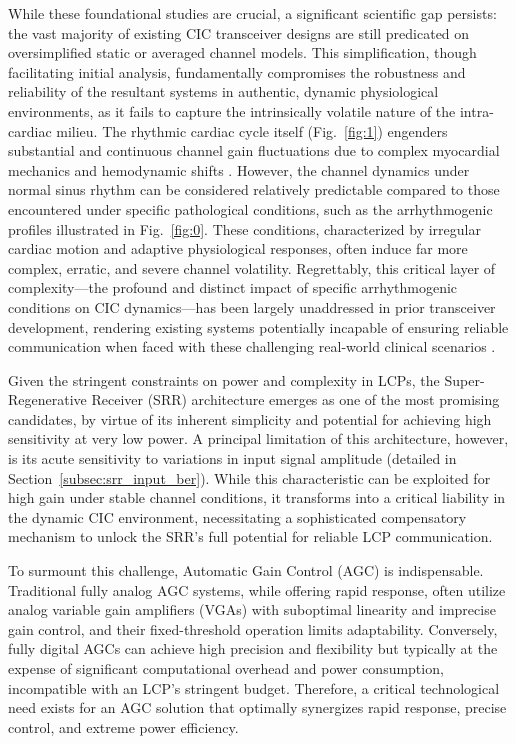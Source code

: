 \documentclass[journal]{IEEEtran}
\begin{document}
While these foundational studies are crucial, a significant scientific gap persists: the vast majority of existing CIC transceiver designs are still predicated on oversimplified static or averaged channel models. This simplification, though facilitating initial analysis, fundamentally compromises the robustness and reliability of the resultant systems in authentic, dynamic physiological environments, as it fails to capture the intrinsically volatile nature of the intra-cardiac milieu. The rhythmic cardiac cycle itself (Fig.~\ref{fig:1}) engenders substantial and continuous channel gain fluctuations due to complex myocardial mechanics and hemodynamic shifts \cite{Zhang2019_placeholder_if_exists}. However, the channel dynamics under normal sinus rhythm can be considered relatively predictable compared to those encountered under specific pathological conditions, such as the arrhythmogenic profiles illustrated in Fig.~\ref{fig:0}. These conditions, characterized by irregular cardiac motion and adaptive physiological responses, often induce far more complex, erratic, and severe channel volatility. Regrettably, this critical layer of complexity—the profound and distinct impact of specific arrhythmogenic conditions on CIC dynamics—has been largely unaddressed in prior transceiver development, rendering existing systems potentially incapable of ensuring reliable communication when faced with these challenging real-world clinical scenarios \cite{Ryser2022ModulationScheme, Bereuter2019LeadlessResync}.

Given the stringent constraints on power and complexity in LCPs, the Super-Regenerative Receiver (SRR) architecture emerges as one of the most promising candidates, by virtue of its inherent simplicity and potential for achieving high sensitivity at very low power. A principal limitation of this architecture, however, is its acute sensitivity to variations in input signal amplitude (detailed in Section~\ref{subsec:srr_input_ber}). While this characteristic can be exploited for high gain under stable channel conditions, it transforms into a critical liability in the dynamic CIC environment, necessitating a sophisticated compensatory mechanism to unlock the SRR's full potential for reliable LCP communication.

To surmount this challenge, Automatic Gain Control (AGC) is indispensable. Traditional fully analog AGC systems, while offering rapid response, often utilize analog variable gain amplifiers (VGAs) with suboptimal linearity and imprecise gain control, and their fixed-threshold operation limits adaptability. Conversely, fully digital AGCs can achieve high precision and flexibility but typically at the expense of significant computational overhead and power consumption, incompatible with an LCP's stringent budget. Therefore, a critical technological need exists for an AGC solution that optimally synergizes rapid response, precise control, and extreme power efficiency.
\end{document}
